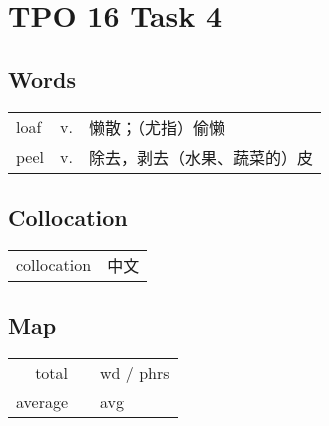 \section{TPO 16 Task 4}

\subsection{Words}

\begin{tabular}{lll}
    loaf & v. & 懒散；（尤指）偷懒      \\
    peel & v. & 除去，剥去（水果、蔬菜的）皮 \\
\end{tabular}

\subsection{Collocation}

\begin{tabular}{ll}
    collocation & 中文 \\
\end{tabular}

\subsection{Map}

\begin{tabular}{rc@{\quad$\to$\quad}l}
    total   &  & wd / phrs \\
    average &  & avg       \\
\end{tabular}

\newpage

